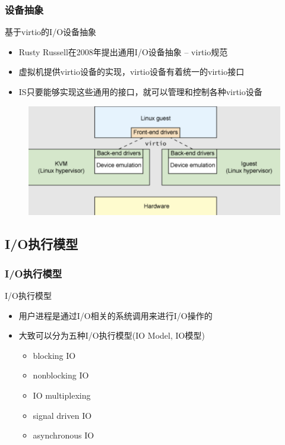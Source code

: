 \begin{frame}[fragile]
    \frametitle{设备抽象}
    基于virtio的I/O设备抽象
    \begin{itemize}
        \item Rusty Russell在2008年提出通用I/O设备抽象 – virtio规范
        \item 虚拟机提供virtio设备的实现，virtio设备有着统一的virtio接口
        \item IS只要能够实现这些通用的接口，就可以管理和控制各种virtio设备
    \end{itemize}
    \begin{figure}
        \includegraphics[width=0.6\linewidth]{figs/virtio.png}
    \end{figure}
\end{frame}
\subsection{I/O执行模型} %
\begin{frame}[fragile]
    \frametitle{I/O执行模型}
    I/O执行模型
    \begin{itemize}
        \item 用户进程是通过I/O相关的系统调用来进行I/O操作的
        \item 大致可以分为五种I/O执行模型(IO Model, IO模型)
        \begin{itemize}
            \item blocking IO
            \item nonblocking IO
            \item IO multiplexing
            \item signal driven IO
            \item asynchronous IO
        \end{itemize}
    \end{itemize}
\end{frame}

